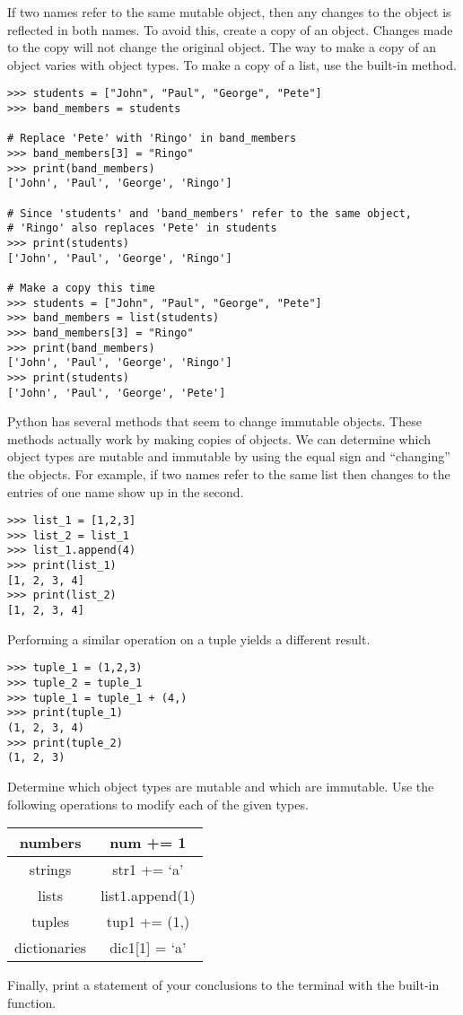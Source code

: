 If two names refer to the same mutable object, then any changes to the object is reflected in both names.
To avoid this, create a copy of an object.
Changes made to the copy will not change the original object.
The way to make a copy of an object varies with object types.
To make a copy of a list, use the  built-in method.

\begin{lstlisting}
>>> students = ["John", "Paul", "George", "Pete"]
>>> band_members = students

# Replace 'Pete' with 'Ringo' in band_members
>>> band_members[3] = "Ringo"
>>> print(band_members)
['John', 'Paul', 'George', 'Ringo']

# Since 'students' and 'band_members' refer to the same object, 
# 'Ringo' also replaces 'Pete' in students
>>> print(students)
['John', 'Paul', 'George', 'Ringo']

# Make a copy this time
>>> students = ["John", "Paul", "George", "Pete"]
>>> band_members = list(students)
>>> band_members[3] = "Ringo"
>>> print(band_members)
['John', 'Paul', 'George', 'Ringo']
>>> print(students)
['John', 'Paul', 'George', 'Pete']
\end{lstlisting}

\begin{problem}
Python has several methods that seem to change immutable objects.
These methods actually work by making copies of objects. We can determine which object types are mutable and immutable by using the equal sign and ``changing'' the objects.
For example, if two names refer to the same list then changes to the entries of one name show up in the second.

\begin{lstlisting}
>>> list_1 = [1,2,3]
>>> list_2 = list_1
>>> list_1.append(4)
>>> print(list_1)
[1, 2, 3, 4]
>>> print(list_2)
[1, 2, 3, 4]
\end{lstlisting}

Performing a similar operation on a tuple yields a different result.
\begin{lstlisting}
>>> tuple_1 = (1,2,3)
>>> tuple_2 = tuple_1
>>> tuple_1 = tuple_1 + (4,)
>>> print(tuple_1)
(1, 2, 3, 4)
>>> print(tuple_2)
(1, 2, 3)
\end{lstlisting}

Determine which object types are mutable and which are immutable.
Use the following operations to modify each of the given types.
\begin{center}
\begin{tabular}{|c|c|}
\hline
numbers & num += 1 \\
\hline
strings & str1 += `a' \\
\hline
lists & list1.append(1) \\
\hline
tuples & tup1 += (1,) \\
\hline
dictionaries & dic1[1] = `a' \\
\hline
\end{tabular}
\end{center}

Finally, print a statement of your conclusions to the terminal with the built-in  function.
\end{problem}


